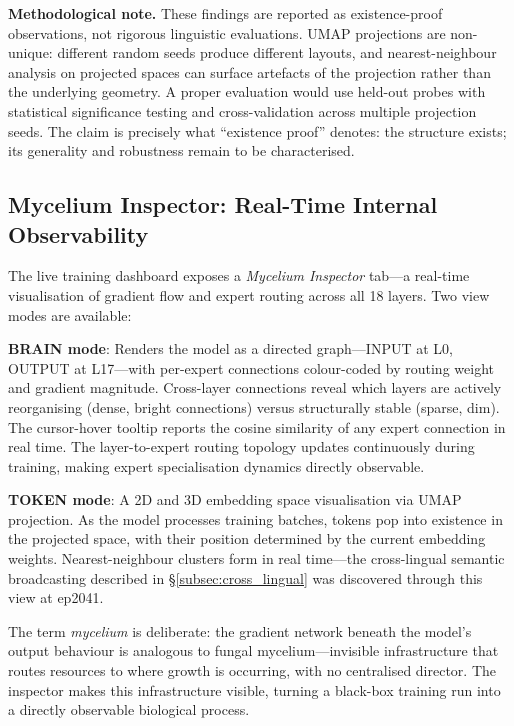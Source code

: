\documentclass[11pt,a4paper]{article}
\begin{document}
\textbf{Methodological note.}
These findings are reported as existence-proof observations, not rigorous linguistic
evaluations. UMAP projections are non-unique: different random seeds produce different
layouts, and nearest-neighbour analysis on projected spaces can surface artefacts of
the projection rather than the underlying geometry. A proper evaluation would use
held-out probes with statistical significance testing and cross-validation across multiple
projection seeds. The claim is precisely what ``existence proof'' denotes: the structure
exists; its generality and robustness remain to be characterised.

\subsection{Mycelium Inspector: Real-Time Internal Observability}
\label{subsec:mycelium_inspector}

The live training dashboard exposes a \emph{Mycelium Inspector} tab---a real-time
visualisation of gradient flow and expert routing across all 18 layers. Two view modes
are available:

\textbf{BRAIN mode}: Renders the model as a directed graph---INPUT at L0, OUTPUT at L17---with
per-expert connections colour-coded by routing weight and gradient magnitude. Cross-layer
connections reveal which layers are actively reorganising (dense, bright connections) versus
structurally stable (sparse, dim). The cursor-hover tooltip reports the cosine similarity
of any expert connection in real time. The layer-to-expert routing topology updates
continuously during training, making expert specialisation dynamics directly observable.

\textbf{TOKEN mode}: A 2D and 3D embedding space visualisation via UMAP projection. As the
model processes training batches, tokens pop into existence in the projected space, with
their position determined by the current embedding weights. Nearest-neighbour clusters form
in real time---the cross-lingual semantic broadcasting described in
\S\ref{subsec:cross_lingual} was discovered through this view at ep2041.

The term \emph{mycelium} is deliberate: the gradient network beneath the model's output
behaviour is analogous to fungal mycelium---invisible infrastructure that routes resources
to where growth is occurring, with no centralised director. The inspector makes this
infrastructure visible, turning a black-box training run into a directly observable
biological process.
\end{document}
